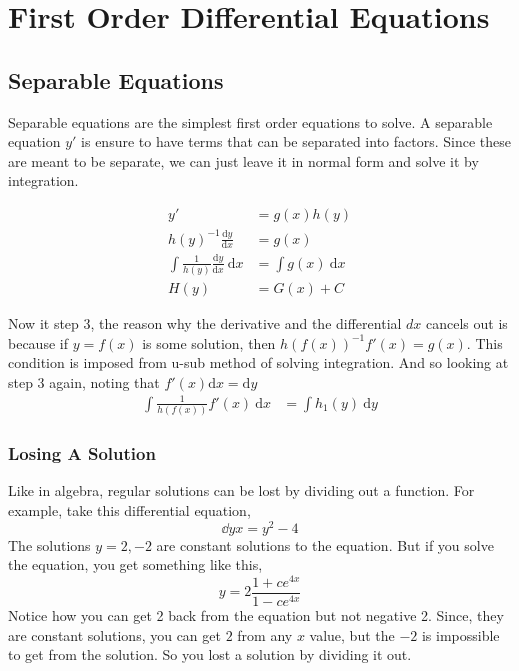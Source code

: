 \chapter{First Order Differential Equations}

\section{Separable Equations}
Separable equations are the simplest first order equations to solve. A separable equation $y'$ is ensure to have terms that can be separated into factors. Since these are meant to be separate, we can just leave it in normal form and solve it by integration. 

\begin{align*}
	y' &= g(x)h(y) \\ 
	h(y)^{-1} \frac{\mathrm{d}y}{\mathrm{d}x} &= g(x) \\ 
	\int \frac{1}{h(y)} \frac{\mathrm{d}y}{\mathrm{d}x} \: \mathrm{d}x &= \int g(x) \: \mathrm{d}x \\ 
	H(y) &= G(x) + C
\end{align*}

Now it step 3, the reason why the derivative and the differential $dx$ cancels out is because if $y=f(x)$
is some solution, then $h(f(x))^{-1}f'(x) = g(x)$. This condition is imposed from u-sub method of solving integration. And so looking at step 3 again, noting that $f'(x)\mathrm{d}x = \mathrm{d}y$
\begin{align*}
	\int \frac{1}{h(f(x))}f'(x)  \: \mathrm{d}x &= \int h_1(y) \: \mathrm{d}y
\end{align*} 

\subsection{Losing A Solution}
Like in algebra, regular solutions can be lost by dividing out a function. For example, take this differential equation, 
\begin{equation*}
	\dd{y}{x} = y^2-4 
\end{equation*}
The solutions $y=2,-2$ are constant solutions to the equation. But if you solve the equation, you get something like this, 
\begin{equation*}
	y = 2 \frac{1+ce^{4x}}{1-ce^{4x}}
\end{equation*} 
Notice how you can get 2 back from the equation but not negative 2. Since, they are constant solutions, you can get $2$ from any $x$ value, but the $-2$ is impossible to get from the solution. So you lost a solution by dividing it out. 
